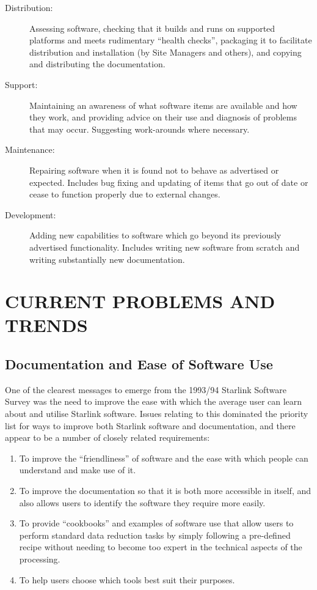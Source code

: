 \documentclass[twoside,11pt]{article}
\newcommand{\xref}[3]{#1}
\newcommand{\qt}[1]{``#1''}
\newcommand{\qt}[1]{{\tt{"}}#1{\tt{"}}}
\newcommand{\mgrref}[1]{\xref{#1}{sgp25}{}}
\begin{document}
\begin{description}
\item[\label{distribution}Distribution:]
Assessing software, checking that it builds and runs on supported
platforms and meets rudimentary \qt{health checks}, packaging it to
facilitate distribution and installation (by \mgrref{Site Managers} and
others), and copying and distributing the documentation.

\item[\label{support}Support:]
Maintaining an awareness of what software items are available and how
they work, and providing advice on their use and diagnosis of problems
that may occur. Suggesting work-arounds where necessary.

\item[\label{maintenance}Maintenance:]
Repairing software when it is found not to behave as advertised or
expected. Includes bug fixing and updating of items that go out of
date or cease to function properly due to external changes.

\item[\label{development}Development:]
Adding new capabilities to software which go beyond its previously
advertised functionality. Includes writing new software from scratch
and writing substantially new documentation.

\end{description}

\section{CURRENT PROBLEMS AND TRENDS}

\subsection{\label{started}Documentation and Ease of Software Use}

One of the clearest messages to emerge from the 1993/94 Starlink
Software Survey was the need to improve the ease with which the
average user can learn about and utilise Starlink software. Issues
relating to this dominated the priority list for ways to improve both
Starlink software and documentation, and there appear to be a number
of closely related requirements:

\begin{enumerate}
\item To improve the \qt{friendliness} of software and the ease with
which people can understand and make use of it.

\item To improve the documentation so that it is both more accessible
in itself, and also allows users to identify the software they require
more easily.

\item To provide \qt{cookbooks} and examples of software use that allow
users to perform standard data reduction tasks by simply following a
pre-defined recipe without needing to become too expert in the
technical aspects of the processing.

\item To help users choose which tools best suit their purposes.
\end{enumerate}
\end{document}

